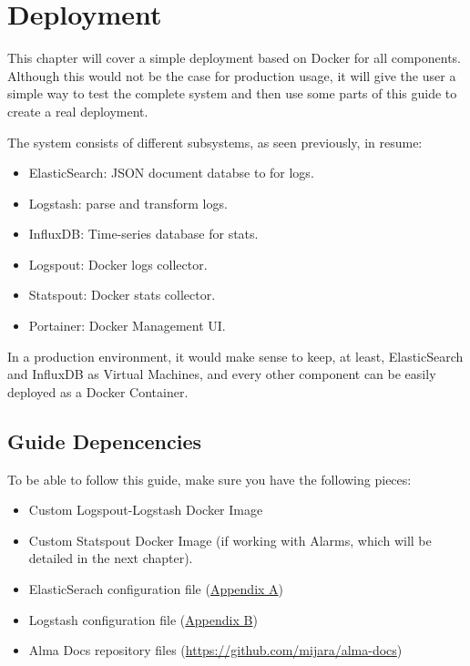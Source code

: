 \chapter{Deployment}

This chapter will cover a simple deployment based on Docker for all components. Although this would not be the case for production usage, it will give the user a simple way to test the complete system and then use some parts of this guide to create a real deployment.

The system consists of different subsystems, as seen previously, in resume:

\begin{itemize}
    \item ElasticSearch: JSON document databse to for logs.
    \item Logstash: parse and transform logs.
    \item InfluxDB: Time-series database for stats.
    \item Logspout: Docker logs collector.
    \item Statspout: Docker stats collector.
    \item Portainer: Docker Management UI.
\end{itemize}

In a production environment, it would make sense to keep, at least, ElasticSearch and InfluxDB as Virtual Machines, and every other component can be easily deployed as a Docker Container.

\section{Guide Depencencies}

To be able to follow this guide, make sure you have the following pieces:

\begin{itemize}
    \item Custom Logspout-Logstash Docker Image
    \item Custom Statspout Docker Image (if working with Alarms, which will be detailed in the next chapter).
    \item ElasticSerach configuration file (\hyperref[sec:appendix-a]{Appendix A})
    \item Logstash configuration file (\hyperref[sec:appendix-b]{Appendix B})
    \item Alma Docs repository files (\url{https://github.com/mijara/alma-docs})
\end{itemize}

